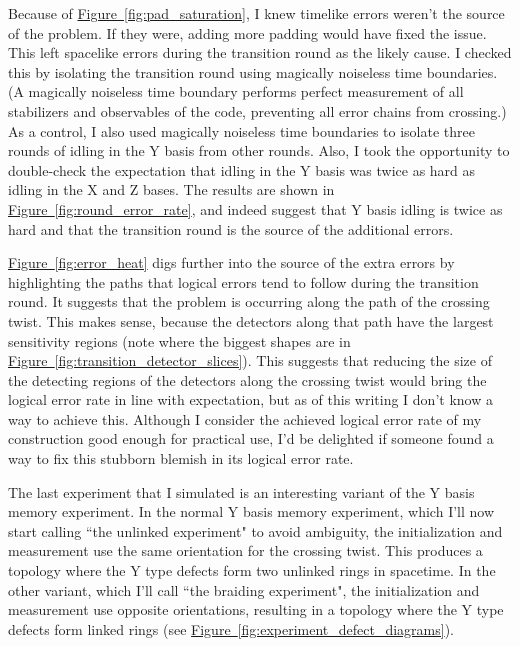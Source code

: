 \documentclass[onecolumn,unpublished,a4paper]{quantumarticle}
\theoremstyle{definition}
\theoremstyle{definition}
\theoremstyle{definition}
\newcommand{\fig}[1]{\hyperref[fig:#1]{Figure~\ref*{fig:#1}}}
\begin{document}
Because of \fig{pad_saturation}, I knew timelike errors weren't the source of the problem.
If they were, adding more padding would have fixed the issue.
This left spacelike errors during the transition round as the likely cause.
I checked this by isolating the transition round using magically noiseless time boundaries.
(A magically noiseless time boundary performs perfect measurement of all stabilizers and observables of the code, preventing all error chains from crossing.)
As a control, I also used magically noiseless time boundaries to isolate three rounds of idling in the Y basis from other rounds.
Also, I took the opportunity to double-check the expectation that idling in the Y basis was twice as hard as idling in the X and Z bases.
The results are shown in \fig{round_error_rate}, and indeed suggest that Y basis idling is twice as hard and that the transition round is the source of the additional errors.

\fig{error_heat} digs further into the source of the extra errors by highlighting the paths that logical errors tend to follow during the transition round.
It suggests that the problem is occurring along the path of the crossing twist.
This makes sense, because the detectors along that path have the largest sensitivity regions (note where the biggest shapes are in \fig{transition_detector_slices}).
This suggests that reducing the size of the detecting regions of the detectors along the crossing twist would bring the logical error rate in line with expectation, but as of this writing I don't know a way to achieve this.
Although I consider the achieved logical error rate of my construction good enough for practical use, I'd be delighted if someone found a way to fix this stubborn blemish in its logical error rate.

The last experiment that I simulated is an interesting variant of the Y basis memory experiment.
In the normal Y basis memory experiment, which I'll now start calling ``the unlinked experiment" to avoid ambiguity, the initialization and measurement use the same orientation for the crossing twist.
This produces a topology where the Y type defects form two unlinked rings in spacetime.
In the other variant, which I'll call ``the braiding experiment", the initialization and measurement use opposite orientations, resulting in a topology where the Y type defects form linked rings (see \fig{experiment_defect_diagrams}).
\end{document}
